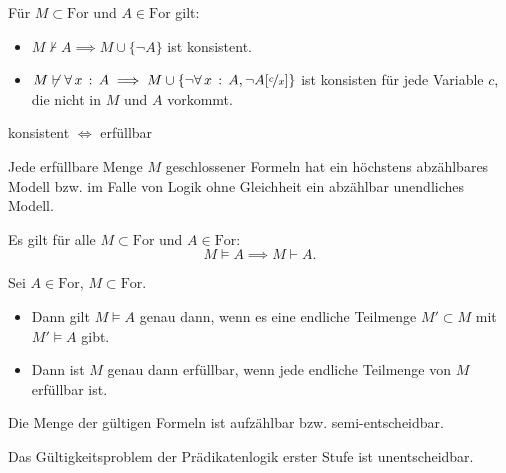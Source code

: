 \documentclass{cheat-sheet}
\newcommand{\For}{\mathrm{For}} %
\newcommand{\subst}[2]{\nicefrac{#1}{#2}} %
\begin{document}
\begin{lem}
  Für $M \subset \For$ und $A \in \For$ gilt:
  \begin{itemize}
    \item $M \not\vdash A \implies M \cup \{ \neg A \}$ ist konsistent.
    \item $M \not\vdash \fa{x} A \implies M \cup \{ \neg \fa{x} A, \neg A[\subst{c}{x}] \}$ ist konsisten für jede Variable $c$, die nicht in $M$ und $A$ vorkommt.
  \end{itemize}
\end{lem}

\begin{lem}
  konsistent $\iff$ erfüllbar
\end{lem}

\begin{satz}
  Jede erfüllbare Menge $M$ geschlossener Formeln hat ein höchstens abzählbares Modell bzw. im Falle von Logik ohne Gleichheit ein abzählbar unendliches Modell.
\end{satz}

\begin{satz}[Vollständigkeit]
  Es gilt für alle $M \subset \For$ und $A \in \For$:
  \[ M \models A \implies M \vdash A. \]
\end{satz}

\begin{satz}
  Sei $A \in \For$, $M \subset \For$.
  \begin{itemize}
    \item Dann gilt $M \models A$ genau dann, wenn es eine endliche Teilmenge $M' \subset M$ mit $M' \models A$ gibt.
    \item Dann ist $M$ genau dann erfüllbar, wenn jede endliche Teilmenge von $M$ erfüllbar ist.
  \end{itemize}
\end{satz}

\begin{bem}
  Die Menge der gültigen Formeln ist aufzählbar bzw. semi-entscheidbar.
\end{bem}

\begin{satz}[Church]
  Das Gültigkeitsproblem der Prädikatenlogik erster Stufe ist unentscheidbar.
\end{satz}
\end{document}
